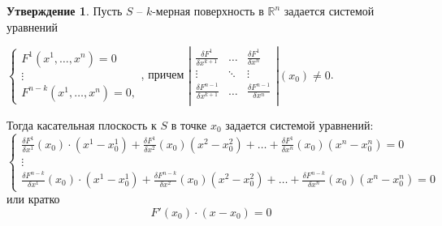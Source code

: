 \documentclass{report}
\theoremstyle{definition}
\newtheorem{statement}{Утверждение}[section]
\begin{document}
\begin{statement}
  Пусть $S$ -- $k$-мерная поверхность в $\mathbb{R}^n$ задается системой уравнений
  \begin{center}
    $\left\{\begin{array}{l}
        F^1(x^1,\ldots,x^n) = 0 \\
        \vdots                  \\
        F^{n-k}(x^1,\ldots,x^n) = 0,
      \end{array}\right.$, причем $\left|\begin{array}{ccc}
        \frac{\delta F^1}{\delta x^{k+1}}     & \ldots & \frac{\delta F^1}{\delta x^n}     \\
        \vdots                                & \ddots & \vdots                            \\
        \frac{\delta F^{n-1}}{\delta x^{k+1}} & \ldots & \frac{\delta F^{n-1}}{\delta x^n} \\
      \end{array}\right|(x_0) \ne 0$.
  \end{center}

  Тогда касательная плоскость к $S$ в точке $x_0$ задается системой уравнений:
  \begin{equation*}
    \left\{\begin{array}{l}
      \frac{\delta F^1}{\delta x^1}(x_0)\cdot (x^1-x^1_0) + \frac{\delta F^1}{\delta x^2}(x_0)(x^2-x_0^2) + \ldots + \frac{\delta F^1}{\delta x^n}(x_0)(x^n - x_0^n) = 0 \\
      \vdots                                                                                                                                                             \\
      \frac{\delta F^{n-k}}{\delta x^1}(x_0)\cdot (x^1-x^1_0) + \frac{\delta F^{n-k}}{\delta x^2}(x_0)(x^2-x_0^2) + \ldots + \frac{\delta F^{n-k}}{\delta x^n}(x_0)(x^n - x_0^n) = 0
    \end{array}\right.
  \end{equation*}
  или кратко
  \begin{equation*}
    F'(x_0)\cdot(x-x_0) = 0
  \end{equation*}
\end{statement}
\end{document}
